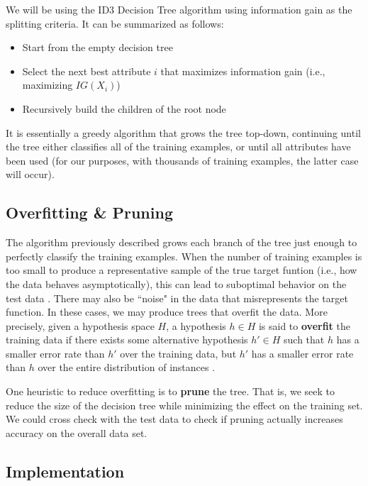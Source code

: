 \documentclass{article}
\begin{document}
We will be using the ID3 Decision Tree algorithm using information gain as the splitting criteria. It can be summarized as follows:

\begin{itemize}
\item Start from the empty decision tree
\item Select the next best attribute $i$ that maximizes information gain (i.e., maximizing $IG(X_i)$)
\item Recursively build the children of the root node
\end{itemize}

It is essentially a greedy algorithm that grows the tree top-down, continuing until the tree either classifies all of the training examples, or until all attributes have been used (for our purposes, with thousands of training examples, the latter case will occur). 

\subsection{Overfitting \& Pruning}

The algorithm previously described grows each branch of the tree just enough to perfectly classify the training examples. When the number of training examples is too small to produce a representative sample of the true target funtion (i.e., how the data behaves asymptotically), this can lead to suboptimal behavior on the test data \cite{mitchell1997}. There may also be ``noise" in the data that misrepresents the target function. In these cases, we may produce trees that overfit the data. More precisely, given a hypothesis space $H$, a hypothesis $h \in H$ is said to \textbf{overfit} the training data if there exists some alternative hypothesis $h' \in H$ such that $h$ has a smaller error rate than $h'$ over the training data, but $h'$ has a smaller error rate than $h$ over the entire distribution of instances \cite{mitchell1997}. 

One heuristic to reduce overfitting is to \textbf{prune} the tree. That is, we seek to reduce the size of the decision tree while minimizing the effect on the training set. We could cross check with the test data to check if pruning actually increases accuracy on the overall data set.

\subsection{Implementation}
\end{document}
